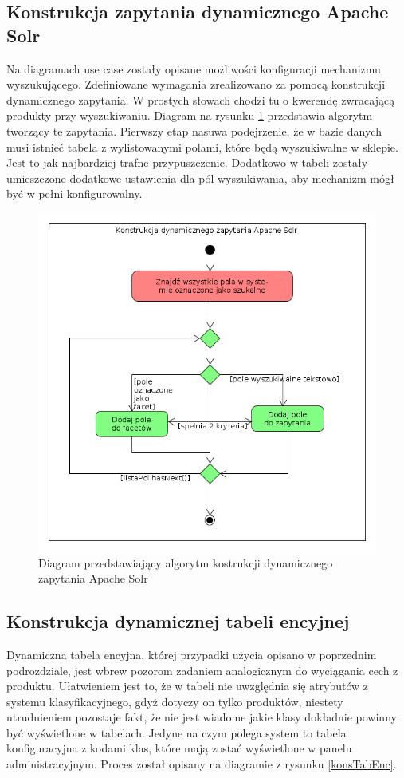 \subsection{Konstrukcja zapytania dynamicznego Apache Solr}
Na diagramach use case zostały opisane możliwości konfiguracji mechanizmu wyszukującego. Zdefiniowane wymagania zrealizowano za pomocą konstrukcji dynamicznego zapytania. W prostych słowach chodzi tu o kwerendę zwracającą produkty przy wyszukiwaniu. Diagram na rysunku \ref{konsDynZapy} przedstawia algorytm tworzący te zapytania. Pierwszy etap nasuwa podejrzenie, że w bazie danych musi istnieć tabela z wylistowanymi polami, które będą wyszukiwalne w sklepie. Jest to jak najbardziej trafne przypuszczenie. Dodatkowo w tabeli zostały umieszczone dodatkowe ustawienia dla pól wyszukiwania, aby mechanizm mógł być w pełni konfigurowalny. 
\begin{figure}
	\begin{center}
		\includegraphics[scale=0.5]{konsDynZapy.png}
	\end{center}
	\caption{{\color{black}Diagram przedstawiający algorytm kostrukcji dynamicznego zapytania Apache Solr}} \label{konsDynZapy}
\end{figure}
\subsection{Konstrukcja dynamicznej tabeli encyjnej}
Dynamiczna tabela encyjna, której przypadki użycia opisano w poprzednim podrozdziale, jest wbrew pozorom zadaniem analogicznym do wyciągania cech z produktu. Ułatwieniem jest to, że w tabeli nie uwzględnia się atrybutów z systemu klasyfikacyjnego, gdyż dotyczy on tylko produktów, niestety utrudnieniem pozostaje fakt, że nie jest wiadome jakie klasy dokładnie powinny być wyświetlone w tabelach. Jedyne na czym polega system to tabela konfiguracyjna z kodami klas, które mają zostać wyświetlone w panelu administracyjnym. Proces został opisany na diagramie z rysunku \ref{konsTabEnc}. 

